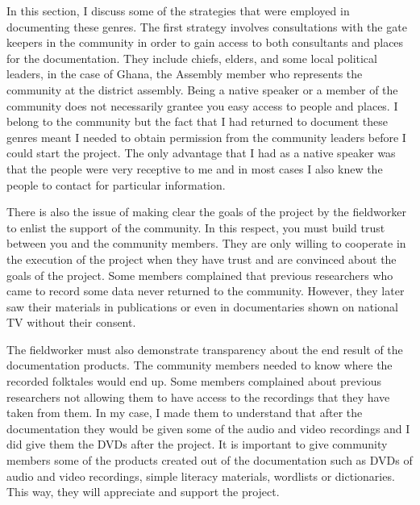 \documentclass[output=paper,colorlinks,citecolor=brown]{langscibook}
\begin{document}
In this section, I discuss some of the strategies that were employed in documenting these genres. The first strategy involves consultations with the gate keepers in the community in order to gain access to both consultants and places for the documentation. They include chiefs, elders,  and some local political leaders,  in the case of Ghana, the Assembly member who represents the community at the district assembly. Being a native speaker or a member of the community does not necessarily grantee you easy access to people and places. I belong to the community but the fact that I had returned to document these genres meant I needed to obtain permission from the community leaders before I could start the project. The only advantage that I had as a native speaker was that the people were very receptive to me and in most cases I also knew the people to contact for particular information. 

There is also the issue of making clear the goals of the project by the fieldworker to enlist the support of the community. In this respect, you must build trust between you and the community members. They are only willing to cooperate in the execution of the project when they have trust and are convinced about the goals of the project. Some members complained that previous researchers who came to record some data never returned to the community. However, they later saw their materials in publications or even in documentaries shown on national TV without their consent.

The fieldworker must also demonstrate transparency about the end result of the documentation products. The community members needed to know where the recorded folktales would end up. Some members complained about previous researchers not allowing them to have access to the recordings that they have taken from them. In my case, I made them to understand that after the documentation they would be given some of the audio and video recordings and I did give them the DVDs after the project. It is important to give community members some of the products created out of the documentation such as DVDs of audio and video recordings, simple literacy materials, wordlists or dictionaries. This way, they will appreciate and support the project.
\end{document}
